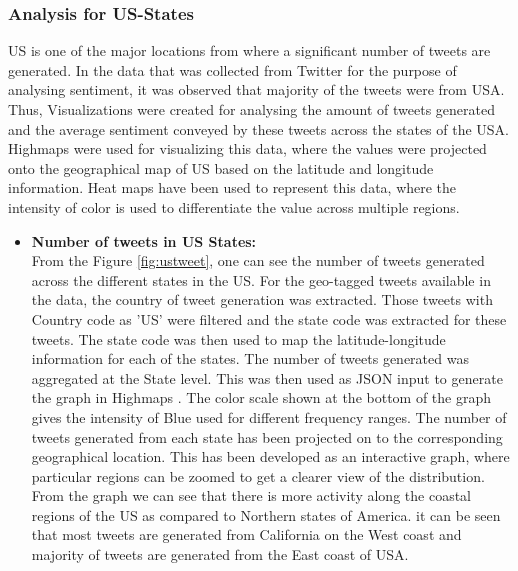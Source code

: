 \documentclass[9pt,twocolumn,twoside]{styles/osajnl}
\begin{document}
\subsubsection{Analysis for US-States}
US is one of the major locations from where a significant number of tweets are generated. In the data that was collected from Twitter for the purpose of analysing sentiment, it was observed that majority of the tweets were from USA. Thus, Visualizations were created for analysing the amount of tweets generated and the average sentiment conveyed by these tweets across the states of the USA. Highmaps \cite{www-highmaps} were used for visualizing this data, where the values were projected onto the geographical map of US based on the latitude and longitude information. Heat maps have been used to represent this data, where the intensity of color is used to differentiate the value across multiple regions. \begin{itemize}
    \item \textbf{Number of tweets in US States:}\\
    From the Figure \ref{fig:ustweet}, one can see the number of tweets generated across the different states in the US. For the geo-tagged tweets available in the data, the country of tweet generation was extracted. Those tweets with Country code as 'US' were filtered and the state code was extracted for these tweets. The state code was then used to map the latitude-longitude information for each of the states. The number of tweets generated was aggregated at the State level. This was then used as JSON input to generate the graph in Highmaps \cite{www-uscount}. The color scale shown at the bottom of the graph gives the intensity of Blue used for different frequency ranges. The number of tweets generated from each state has been projected on to the corresponding geographical location. This has been developed as an interactive graph, where particular regions can be zoomed to get a clearer view of the distribution. From the graph we can see that there is more activity along the coastal regions of the US as compared to Northern states of America. it can be seen that most tweets are generated from California on the West coast and majority of tweets are generated from the East coast of USA.  
    \begin{figure}[htbp]
    \centering

\end{figure}
\end{itemize}
\end{document}
